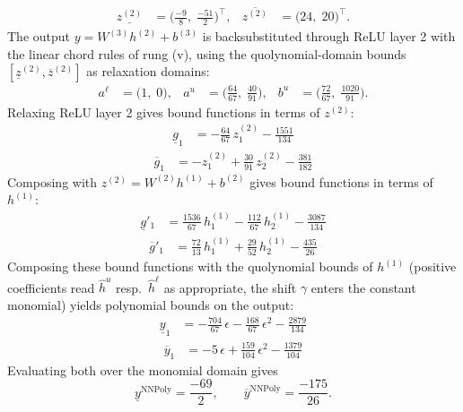 \documentclass[11pt]{article}
\begin{document}
\begin{align*}
\underline{z^{(2)}} &= \bigl(\frac{-9}{8},\; \frac{-51}{2}\bigr)^{\!\top}, & \overline{z^{(2)}} &= \bigl(24,\; 20\bigr)^{\!\top}.
\end{align*}
The output $y = W^{(3)} h^{(2)} + b^{(3)}$ is backsubstituted through ReLU layer 2 with the linear chord rules of rung (v), using the quolynomial-domain bounds
$[\underline{z}^{(2)}, \overline{z}^{(2)}]$ as relaxation domains:
\begin{align*}
a^{\ell} &= \bigl(1,\; 0\bigr), & a^{u} &= \bigl(\frac{64}{67},\; \frac{40}{91}\bigr), & b^{u} &= \bigl(\frac{72}{67},\; \frac{1020}{91}\bigr).
\end{align*}
Relaxing ReLU layer 2 gives bound functions in terms of $z^{(2)}$:
\begin{align*}
\underline{g}_{1} &= -\frac{64}{67}\,z^{(2)}_{1} - \frac{1551}{134}
\end{align*}
\begin{align*}
\overline{g}_{1} &= -z^{(2)}_{1} + \frac{30}{91}\,z^{(2)}_{2} - \frac{381}{182}
\end{align*}
Composing with $z^{(2)} = W^{(2)} h^{(1)} + b^{(2)}$ gives bound functions in terms of $h^{(1)}$:
\begin{align*}
\underline{g}'_{1} &= \frac{1536}{67}\,h^{(1)}_{1} - \frac{112}{67}\,h^{(1)}_{2} - \frac{3087}{134}
\end{align*}
\begin{align*}
\overline{g}'_{1} &= \frac{72}{13}\,h^{(1)}_{1} + \frac{29}{52}\,h^{(1)}_{2} - \frac{435}{26}
\end{align*}
Composing these bound functions with the quolynomial bounds of $h^{(1)}$ (positive
coefficients read $\hat{h}^{u}$ resp.\ $\hat{h}^{\ell}$ as appropriate, the shift $\gamma$ enters the
constant monomial) yields polynomial bounds on the output:
\begin{align*}
\underline{y}_{1} &= -\frac{704}{67}\,\epsilon - \frac{168}{67}\,\epsilon^2 - \frac{2879}{134}
\end{align*}
\begin{align*}
\overline{y}_{1} &= -5\,\epsilon + \frac{159}{104}\,\epsilon^2 - \frac{1379}{104}
\end{align*}
Evaluating both over the monomial domain gives
\begin{equation*}
\underline{y}^{\text{NNPoly}} = \frac{-69}{2}, \qquad \overline{y}^{\text{NNPoly}} = \frac{-175}{26}.
\end{equation*}
\end{document}
